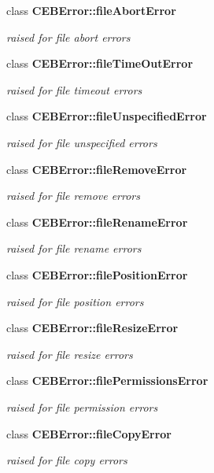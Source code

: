 \begin{DoxyCompactItemize}
class {\bf C\-E\-B\-Error\-::file\-Abort\-Error}
\begin{DoxyCompactList}\small\item\em raised for file abort errors \end{DoxyCompactList}\item 
class {\bf C\-E\-B\-Error\-::file\-Time\-Out\-Error}
\begin{DoxyCompactList}\small\item\em raised for file timeout errors \end{DoxyCompactList}\item 
class {\bf C\-E\-B\-Error\-::file\-Unspecified\-Error}
\begin{DoxyCompactList}\small\item\em raised for file unspecified errors \end{DoxyCompactList}\item 
class {\bf C\-E\-B\-Error\-::file\-Remove\-Error}
\begin{DoxyCompactList}\small\item\em raised for file remove errors \end{DoxyCompactList}\item 
class {\bf C\-E\-B\-Error\-::file\-Rename\-Error}
\begin{DoxyCompactList}\small\item\em raised for file rename errors \end{DoxyCompactList}\item 
class {\bf C\-E\-B\-Error\-::file\-Position\-Error}
\begin{DoxyCompactList}\small\item\em raised for file position errors \end{DoxyCompactList}\item 
class {\bf C\-E\-B\-Error\-::file\-Resize\-Error}
\begin{DoxyCompactList}\small\item\em raised for file resize errors \end{DoxyCompactList}\item 
class {\bf C\-E\-B\-Error\-::file\-Permissions\-Error}
\begin{DoxyCompactList}\small\item\em raised for file permission errors \end{DoxyCompactList}\item 
class {\bf C\-E\-B\-Error\-::file\-Copy\-Error}
\begin{DoxyCompactList}\small\item\em raised for file copy errors \end{DoxyCompactList}\item 

\end{DoxyCompactItemize}
